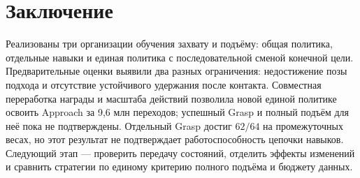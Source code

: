 \documentclass{misisarticle}
\begin{document}
\section{Заключение}
Реализованы три организации обучения захвату и подъёму: общая политика, отдельные навыки и единая политика с последовательной сменой конечной цели. Предварительные оценки выявили два разных ограничения: недостижение позы подхода и отсутствие устойчивого удержания после контакта. Совместная переработка награды и масштаба действий позволила новой единой политике освоить Approach за 9,6 млн переходов; успешный Grasp и полный подъём для неё пока не подтверждены. Отдельный Grasp достиг $62/64$ на промежуточных весах, но этот результат не подтверждает работоспособность цепочки навыков. Следующий этап --- проверить передачу состояний, отделить эффекты изменений и сравнить стратегии по единому критерию полного подъёма и бюджету данных.
\end{document}

